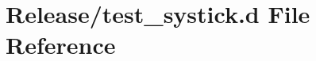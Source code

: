 \hypertarget{test__systick_8d}{}\section{Release/test\+\_\+systick.d File Reference}
\label{test__systick_8d}
